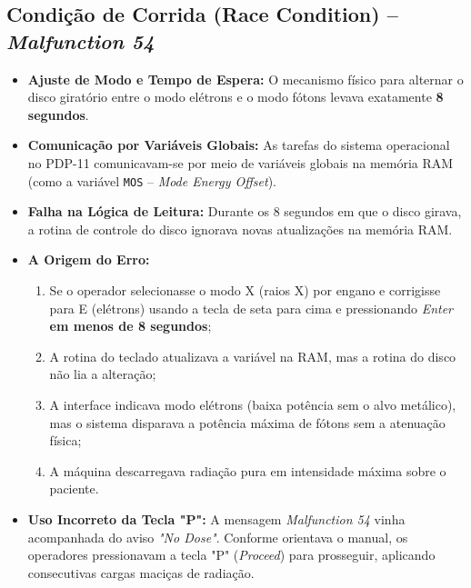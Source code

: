 \documentclass[12pt, a4paper]{article}
\begin{document}
\subsection{Condição de Corrida (Race Condition) -- \textit{Malfunction 54}}
\begin{itemize}
    \item \textbf{Ajuste de Modo e Tempo de Espera:} O mecanismo físico para alternar o disco giratório entre o modo elétrons e o modo fótons levava exatamente \textbf{8 segundos}.
    \item \textbf{Comunicação por Variáveis Globais:} As tarefas do sistema operacional no PDP-11 comunicavam-se por meio de variáveis globais na memória RAM (como a variável \texttt{MOS} -- \textit{Mode Energy Offset}).
    \item \textbf{Falha na Lógica de Leitura:} Durante os 8 segundos em que o disco girava, a rotina de controle do disco ignorava novas atualizações na memória RAM.
    \item \textbf{A Origem do Erro:}
    \begin{enumerate}
        \item Se o operador selecionasse o modo X (raios X) por engano e corrigisse para E (elétrons) usando a tecla de seta para cima e pressionando \textit{Enter} \textbf{em menos de 8 segundos};
        \item A rotina do teclado atualizava a variável na RAM, mas a rotina do disco não lia a alteração;
        \item A interface indicava modo elétrons (baixa potência sem o alvo metálico), mas o sistema disparava a potência máxima de fótons sem a atenuação física;
        \item A máquina descarregava radiação pura em intensidade máxima sobre o paciente.
    \end{enumerate}
    \item \textbf{Uso Incorreto da Tecla "P":} A mensagem \textit{Malfunction 54} vinha acompanhada do aviso \textit{"No Dose"}. Conforme orientava o manual, os operadores pressionavam a tecla "P" (\textit{Proceed}) para prosseguir, aplicando consecutivas cargas maciças de radiação.
\end{itemize}
\end{document}
